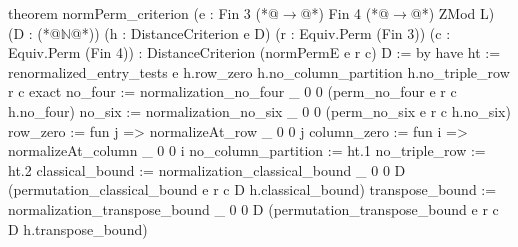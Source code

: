 theorem normPerm_criterion (e : Fin 3 (*@$\to$@*) Fin 4 (*@$\to$@*) ZMod L) (D : (*@$\mathbb N$@*))
    (h : DistanceCriterion e D) (r : Equiv.Perm (Fin 3)) (c : Equiv.Perm (Fin 4)) :
    DistanceCriterion (normPermE e r c) D := by
  have ht := renormalized_entry_tests e h.row_zero h.no_column_partition h.no_triple_row r c
  exact {
    no_four := normalization_no_four _ 0 0 (perm_no_four e r c h.no_four)
    no_six := normalization_no_six _ 0 0 (perm_no_six e r c h.no_six)
    row_zero := fun j => normalizeAt_row _ 0 0 j
    column_zero := fun i => normalizeAt_column _ 0 0 i
    no_column_partition := ht.1
    no_triple_row := ht.2
    classical_bound := normalization_classical_bound _ 0 0 D (permutation_classical_bound e r c D h.classical_bound)
    transpose_bound := normalization_transpose_bound _ 0 0 D (permutation_transpose_bound e r c D h.transpose_bound)
  }
